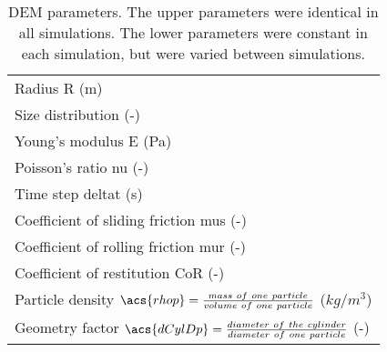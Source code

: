 \begin{table}[h]
\centering
\begin{tabular}{l}
\toprule
    Radius \acs{R} (m)   \\ [5pt]

	Size distribution (-) \\ [5pt]

    Young's modulus \acs{E} (Pa)  \\ [5pt]

    Poisson's ratio \acs{nu} (-) \\ 
     Time step \acs{deltat} (s) \\ [5pt]
\midrule
     Coefficient of sliding friction \acs{mus} (-)\\  [5pt]
    Coefficient of rolling friction \acs{mur} (-) \\ [5pt]
    Coefficient of restitution \acs{CoR} (-)   \\ [5pt]
     Particle density $\acs{rhop} = \frac{mass ~ of ~ one ~ particle}{volume ~ of
     ~ one ~ particle}$ ($kg/m^3$)  \\ [5pt]
     Geometry factor $\acs{dCylDp} = \frac{diameter ~ of ~ the ~
     cylinder}{diameter ~ of ~ one ~ particle}$ (-)  \\ [5pt]
   
\bottomrule
\end{tabular}
\caption[DEM parameters]{DEM parameters. The upper parameters were
identical in all simulations. The lower parameters were constant in each
simulation, but were varied between simulations.}
\label{tab:08DEMparameters}
\end{table}

